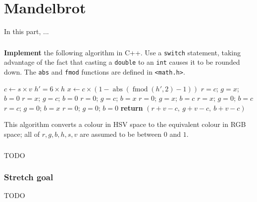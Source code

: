 \part{Mandelbrot}

In this part, ...

\section{} \label{core-c-first}

\textbf{Implement} the following algorithm in C++. Use a \lstinline{switch} statement,
taking advantage of the fact that casting a \lstinline{double} to an \lstinline{int} causes it to be rounded down.
The \lstinline{abs} and \lstinline{fmod} functions are defined in \lstinline{<math.h>}.

\begin{algorithm}
\begin{algorithmic}
		\State $c \gets s \times v$
		\State $h' = 6 \times h$
		\State $x \gets c \times \left(1 - \operatorname{abs} \left( \operatorname{fmod} \left( h', 2 \right) - 1 \right) \right)$
		     \State $r = c$; $g = x$; $b = 0$
		  \State $r = x$; $g = c$; $b = 0$
		  \State $r = 0$; $g = c$; $b = x$
		  \State $r = 0$; $g = x$; $b = c$
		  \State $r = x$; $g = 0$; $b = c$
		  \State $r = c$; $g = 0$; $b = x$
		\Else                    \State $r = 0$; $g = 0$; $b = 0$
		\EndIf
		\State \textbf{return} $(r+v-c,\ g+v-c,\ b+v-c)$
	\EndProcedure
\end{algorithmic}
\end{algorithm}

This algorithm converts a colour in HSV space to the equivalent colour in RGB space;
all of $r,g,b,h,s,v$ are assumed to be between $0$ and $1$.

\section{} \label{core-c-last}

TODO

\section{Stretch goal} \label{stretch-c}

TODO
